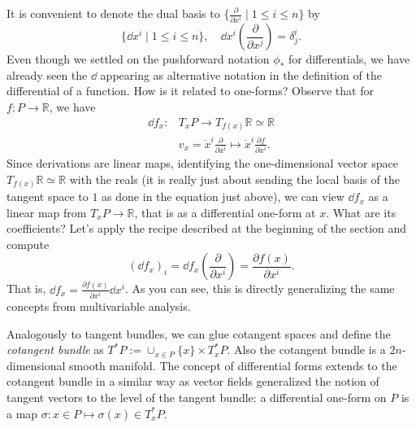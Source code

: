 \documentclass[english,fontsize=11pt,paper=b5]{scrbook}
\theoremstyle{definition}
\begin{document}
    It is convenient to denote the dual basis to $\{\frac{\partial}{\partial x^i} \mid 1\leq i \leq n\}$ by
    \begin{equation}
      \{ \dd x^i \mid 1 \leq i \leq n \}, \quad \dd x^i\left(\frac{\partial}{\partial x^j}\right) = \delta_j^i.
    \end{equation}
    Even though we settled on the pushforward notation $\phi_*$ for differentials, we have already seen the $\dd$ appearing as alternative notation in the definition of the differential of a function.
    How is it related to one-forms?
    Observe that for $f : P \to \mathbb{R}$, we have
    \begin{align}
      \dd f_x : & T_x P \to T_{f(x)} \mathbb{R} \simeq \mathbb{R} \\
                & v_x = \dot x^i \frac{\partial}{\partial x^i} \mapsto \dot x^i \frac{\partial f}{\partial x^i}.
    \end{align}
    Since derivations are linear maps, identifying the one-dimensional vector space $T_{f(x)}\mathbb{R} \simeq \mathbb{R}$ with the reals (it is really just about sending the local basis of the tangent space to $1$ as done in the equation just above), we can view $\dd f_x$ as a linear map from $T_x P \to \mathbb{R}$, that is as a differential one-form at $x$.
    What are its coefficients? Let's apply the recipe described at the beginning of the section and compute
    \begin{equation}
      (\dd f_x)_i = \dd f_x\left(\frac{\partial}{\partial x^i}\right) = \frac{\partial f(x)}{\partial x^i}.
    \end{equation}
    That is, $\dd f_x = \frac{\partial f(x)}{\partial x^i} \dd x^i$.
    As you can see, this is directly generalizing the same concepts from multivariable analysis.

    Analogously to tangent bundles, we can glue cotangent spaces and define the \emph{cotangent bundle} as $T^*P := \cup_{x\in P} \{x\}\times T^*_x P$. Also the cotangent bundle is a $2n$-dimensional smooth manifold.
    The concept of differential forms extends to the cotangent bundle in a similar way as vector fields generalized the notion of tangent vectors to the level of the tangent bundle: a differential one-form on $P$ is a map $\sigma : x\in P \mapsto \sigma(x) \in T^*_x P$.
\end{document}
